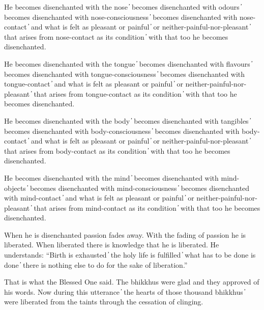 He becomes disenchanted with the nose  ̓  becomes disenchanted with odours  ̓  becomes disenchanted with nose-consciousness  ̓  becomes disenchanted with nose-contact  ̓  and what is felt as pleasant or painful  ̓  or neither-painful-nor-pleasant  ̓  that arises from nose-contact as its condition  ̓  with that too he becomes disenchanted.

He becomes disenchanted with the tongue  ̓  becomes disenchanted with flavours  ̓  becomes disenchanted with tongue-consciousness  ̓  becomes disenchanted with tongue-contact  ̓  and what is felt as pleasant or painful  ̓  or neither-painful-nor-pleasant  ̓  that arises from tongue-contact as its condition  ̓  with that too he becomes disenchanted.

He becomes disenchanted with the body  ̓  becomes disenchanted with tangibles  ̓  becomes disenchanted with body-consciousness  ̓  becomes disenchanted with body-contact  ̓  and what is felt as pleasant or painful  ̓  or neither-painful-nor-pleasant  ̓  that arises from body-contact as its condition  ̓  with that too he becomes disenchanted.

He becomes disenchanted with the mind  ̓  becomes disenchanted with mind-objects  ̓  becomes disenchanted with mind-consciousness  ̓  becomes disenchanted with mind-contact  ̓  and what is felt as pleasant or painful  ̓  or neither-painful-nor-pleasant  ̓  that arises from mind-contact as its condition  ̓  with that too he becomes disenchanted.

When he is disenchanted passion fades away. With the fading of passion he is liberated. When liberated there is knowledge that he is liberated. He understands: “Birth is exhausted  ̓  the holy life is fulfilled  ̓  what has to be done is done  ̓  there is nothing else to do for the sake of liberation.”

That is what the Blessed One said. The bhikkhus were glad and they approved of his words. Now during this utterance  ̓  the hearts of those thousand bhikkhus  ̓  were liberated from the taints through the cessation of clinging.

